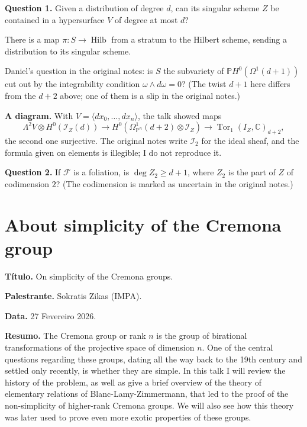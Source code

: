\medskip\noindent
{\bf Question 1.} Given a distribution of
degree $d$, can its singular scheme $Z$ be
contained in a hypersurface $V$ of degree at
most $d$?

There is a map $\pi\colon S\to
\operatorname{Hilb}$ from a stratum to the
Hilbert scheme, sending a distribution to
its singular scheme.

Daniel's question in the original notes: is
$S$ the subvariety of
$\mathbb{P}H^0(\Omega^1(d+1))$ cut out by
the integrability condition
$\omega\wedge d\omega=0$? (The twist $d+1$
here differs from the $d+2$ above; one of
them is a slip in the original notes.)

\medskip\noindent
{\bf A diagram.} With
$V=\langle dx_0,\ldots,dx_n\rangle$, the
talk showed maps
$$
\Lambda^2V\otimes H^0(\mathcal{I}_Z(d))
\longrightarrow
H^0(\Omega^1_{\mathbb{P}^n}(d+2)
\otimes\mathcal{I}_Z)
\longrightarrow
\operatorname{Tor}_1(I_Z,\mathbb{C})_{d+2},
$$
the second one surjective. The original
notes write $\mathcal{I}_2$ for the ideal
sheaf, and the formula given on elements is
illegible; I do not reproduce it.

\medskip\noindent
{\bf Question 2.} If $\mathcal{F}$ is a
foliation, is $\deg Z_2\geq d+1$, where
$Z_2$ is the part of $Z$ of codimension
$2$? (The codimension is marked as
uncertain in the original notes.)



\section{About simplicity of the Cremona
group}
\label{section-simplicity-Cremona-group}

\medskip\noindent
\textbf{Título.}
On simplicity of the Cremona groups.

\medskip\noindent
\textbf{Palestrante.}
Sokratis Zikas (IMPA).

\medskip\noindent
\textbf{Data.}
27 Fevereiro 2026.

\medskip\noindent
\textbf{Resumo.}
The Cremona group or rank $n$ is the group of
birational transformations of the projective
space of dimension $n$.
One of the central questions regarding these
groups, dating all the way back to the 19th
century and settled only recently, is whether
they are simple.
In this talk I will review the history of the
problem, as well as give a brief overview of
the theory of elementary relations of
Blanc-Lamy-Zimmermann, that led to the proof
of the non-simplicity of higher-rank Cremona
groups.
We will also see how this theory was later
used to prove even more exotic properties of
these groups.

